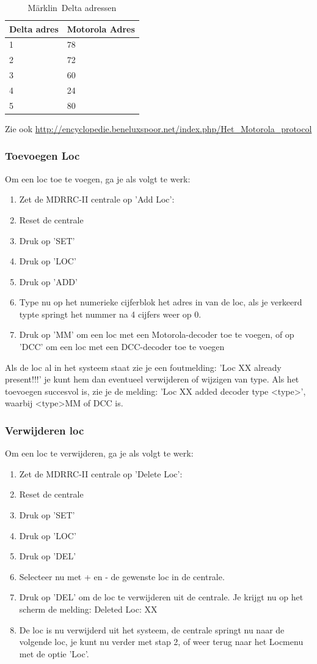 \documentclass[12pt,a4paper]{report}
\newcommand*{\marklin}{M\"{a}rklin}
\begin{document}
\begin{table}[!ht]
\begin{tabular}{|l|l|}
\hline
Delta adres&Motorola Adres\\
\hline
1&78\\
\hline
2&72\\
\hline
3&60\\
\hline
4&24\\
\hline
5&80\\
\hline
\end{tabular}
\caption{\marklin \ Delta adressen}
\end{table}

Zie ook \url{http://encyclopedie.beneluxspoor.net/index.php/Het_Motorola_protocol}

\subsubsection{Toevoegen Loc}
Om een loc toe te voegen, ga je als volgt te werk:

\begin{enumerate}
\item Zet de MDRRC-II centrale op 'Add Loc': 
\item Reset de centrale
\item Druk op 'SET'
\item Druk op 'LOC'
\item Druk op 'ADD'
\item Type nu op het numerieke cijferblok het adres in van de loc, als je verkeerd typte springt het nummer na 4 cijfers weer op 0.
\item Druk op 'MM' om een loc met een Motorola-decoder toe te voegen, of op 'DCC' om een loc met een DCC-decoder toe te voegen
\end{enumerate}

Als de loc al in het systeem staat zie je een foutmelding:
 'Loc XX already present!!!'
je kunt hem dan eventueel verwijderen of wijzigen van type. Als het toevoegen succesvol is, zie je de melding: 'Loc XX added decoder type \textless type\textgreater ', 
waarbij \textless type\textgreater  MM of DCC is.
\subsubsection{Verwijderen loc}
Om een loc te verwijderen, ga je als volgt te werk:
\begin{enumerate}
\item Zet de MDRRC-II centrale op 'Delete Loc': 
\item Reset de centrale
\item Druk op 'SET'
\item Druk op 'LOC'
\item Druk op 'DEL'
\item Selecteer nu met + en - de gewenste loc in de centrale.
\item Druk op 'DEL' om de loc te verwijderen uit de centrale. Je krijgt nu op het scherm de melding:
Deleted Loc: XX
\item De loc is nu verwijderd uit het systeem, de centrale springt nu naar de volgende loc, je kunt nu verder met stap 2, of weer terug naar het Locmenu met de optie 'Loc'.
\end{enumerate}
\end{document}
